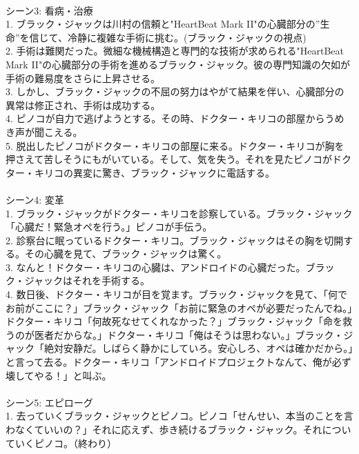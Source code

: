 \documentclass[a4j,12pt]{jsreport}
\begin{document}
\begin{breakitembox}
   \\
   {シーン3: 看病・治療}\\
   1. ブラック・ジャックは川村の信頼と"HeartBeat Mark II"の心臓部分の”生命”を信じて、冷静に複雑な手術に挑む。(ブラック・ジャックの視点)\\
   2. 手術は難関だった。微細な機械構造と専門的な技術が求められる"HeartBeat Mark II"の心臓部分の手術を進めるブラック・ジャック。彼の専門知識の欠如が手術の難易度をさらに上昇させる。\\
   3. しかし、ブラック・ジャックの不屈の努力はやがて結果を伴い、心臓部分の異常は修正され、手術は成功する。\\
   4. ピノコが自力で逃げようとする。その時、ドクター・キリコの部屋からうめき声が聞こえる。\\
   5. 脱出したピノコがドクター・キリコの部屋に来る。ドクター・キリコが胸を押さえて苦しそうにもがいている。そして、気を失う。それを見たピノコがドクター・キリコの異変に驚き、ブラック・ジャックに電話する。\\
   \\
   {シーン4: 変革}\\
   1. ブラック・ジャックがドクター・キリコを診察している。ブラック・ジャック「心臓だ！緊急オペを行う。」ピノコが手伝う。\\
   2. 診察台に眠っているドクター・キリコ。ブラック・ジャックはその胸を切開する。その心臓を見て、ブラック・ジャックは驚く。\\
   3. なんと！ドクター・キリコの心臓は、アンドロイドの心臓だった。ブラック・ジャックはそれを手術する。\\
   4. 数日後、ドクター・キリコが目を覚ます。ブラック・ジャックを見て、「何でお前がここに？」ブラック・ジャック「お前に緊急のオペが必要だったんでね。」ドクター・キリコ「何故死なせてくれなかった？」ブラック・ジャック「命を救うのが医者だからな。」ドクター・キリコ「俺はそうは思わない。」ブラック・ジャック「絶対安静だ。しばらく静かにしていろ。安心しろ、オペは確かだから。」と言って去る。ドクター・キリコ「アンドロイドプロジェクトなんて、俺が必ず壊してやる！」と叫ぶ。\\
   \\
   {シーン5: エピローグ}\\
   1. 去っていくブラック・ジャックとピノコ。ピノコ「せんせい、本当のことを言わなくていいの？」それに応えず、歩き続けるブラック・ジャック。それについていくピノコ。（終わり）\\
   
\end{breakitembox}
\vspace*{-7pt}
\begingroup
{}
\label{plot_decided}
\endgroup
\end{document}
